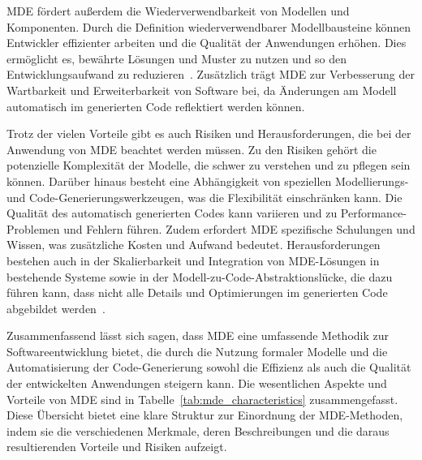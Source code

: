 MDE fördert außerdem die Wiederverwendbarkeit von Modellen und Komponenten. Durch die Definition wiederverwendbarer 
Modellbausteine können Entwickler effizienter arbeiten und die Qualität der Anwendungen erhöhen. Dies ermöglicht es, 
bewährte Lösungen und Muster zu nutzen und so den Entwicklungsaufwand zu reduzieren~\cite{France_2007}. Zusätzlich 
trägt MDE zur Verbesserung der Wartbarkeit und Erweiterbarkeit von Software bei, da Änderungen am Modell automatisch 
im generierten Code reflektiert werden können.

Trotz der vielen Vorteile gibt es auch Risiken und Herausforderungen, die bei der Anwendung von MDE beachtet werden 
müssen. Zu den Risiken gehört die potenzielle Komplexität der Modelle, die schwer zu verstehen und zu pflegen sein 
können. Darüber hinaus besteht eine Abhängigkeit von speziellen Modellierungs- und Code-Generierungswerkzeugen, was 
die Flexibilität einschränken kann. Die Qualität des automatisch generierten Codes kann variieren und zu 
Performance-Problemen und Fehlern führen. Zudem erfordert MDE spezifische Schulungen und Wissen, was zusätzliche
Kosten und Aufwand bedeutet. Herausforderungen bestehen auch in der Skalierbarkeit und Integration von MDE-Lösungen 
in bestehende Systeme sowie in der Modell-zu-Code-Abstraktionslücke, die dazu führen kann, dass nicht alle Details 
und Optimierungen im generierten Code abgebildet werden~\cite{france2007model}.

Zusammenfassend lässt sich sagen, dass MDE eine umfassende Methodik zur Softwareentwicklung bietet, die durch 
die Nutzung formaler Modelle und die Automatisierung der Code-Generierung sowohl die Effizienz als auch die 
Qualität der entwickelten Anwendungen steigern kann. Die wesentlichen Aspekte und Vorteile von MDE sind 
in Tabelle~\ref{tab:mde_characteristics} zusammengefasst. Diese Übersicht bietet eine klare Struktur zur 
Einordnung der MDE-Methoden, indem sie die verschiedenen Merkmale, deren Beschreibungen und die daraus 
resultierenden Vorteile und Risiken aufzeigt.

